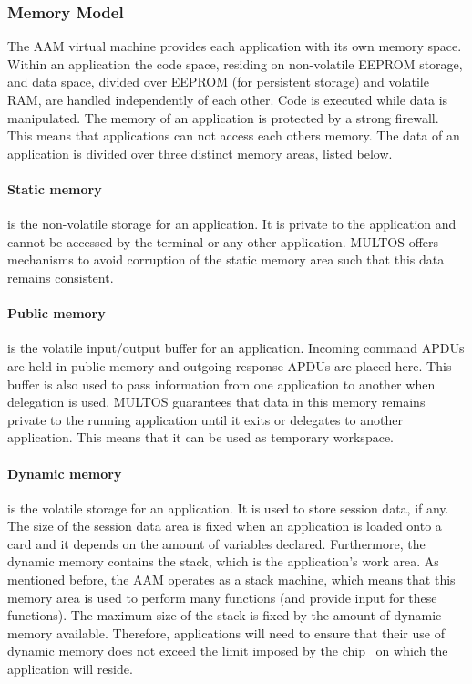 \subsubsection{Memory Model}

The AAM virtual machine provides each application with its own memory space.
Within an application the code space, residing on non-volatile EEPROM storage,
and data space, divided over EEPROM (for persistent storage) and volatile RAM,
are handled independently of each other. Code is executed while data is
manipulated. The memory of an application is protected by a strong firewall.
This means that applications can not access each others memory. The data of an
application is divided over three distinct memory areas, listed below.

\paragraph{Static memory} is the non-volatile storage for an application. It is
private to the application and cannot be accessed by the terminal or any other
application. MULTOS offers mechanisms to avoid corruption of the static memory
area such that this data remains consistent.

\paragraph{Public memory} is the volatile input/output buffer for an
application. Incoming command APDUs are held in public memory and outgoing
response APDUs are placed here. This buffer is also used to pass information
from one application to another when delegation is used. MULTOS guarantees that
data in this memory remains private to the running application until it exits
or delegates to another application. This means that it can be used as
temporary workspace.

\paragraph{Dynamic memory} is the volatile storage for an application. It is
used to store session data, if any. The size of the session data area is fixed
when an application is loaded onto a card and it depends on the amount of
variables declared. Furthermore, the dynamic memory contains the stack, which
is the application's work area. As mentioned before, the AAM operates as a
stack machine, which means that this memory area is used to perform many
functions (and provide input for these functions). The maximum size of the
stack is fixed by the amount of dynamic memory available. Therefore,
applications will need to ensure that their use of dynamic memory does not
exceed the limit imposed by the chip~\cite{MIR2012} on which the application
will reside.
